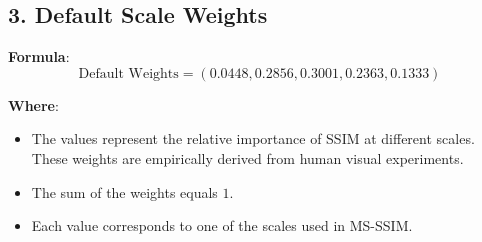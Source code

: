\documentclass{article}
\begin{document}
\subsection*{3. Default Scale Weights}

\textbf{Formula}: 
\begin{equation}
\text{Default Weights} = (0.0448, 0.2856, 0.3001, 0.2363, 0.1333)
\end{equation}

\textbf{Where}:
\begin{itemize}
    \item The values represent the relative importance of SSIM at different scales. These weights are empirically derived from human visual experiments.
    \item The sum of the weights equals $1$.
    \item Each value corresponds to one of the scales used in MS-SSIM.
\end{itemize}
\end{document}
